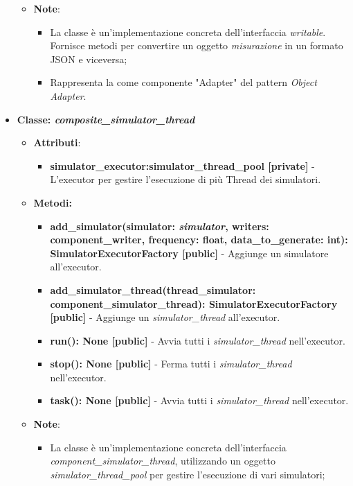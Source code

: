 \begin{itemize}
\begin{itemize}
\begin{itemize}
        \end{itemize}
        \item\textbf{Note}:
        \begin{itemize}
            \item La classe è un'implementazione concreta dell'interfaccia \textit{writable}. Fornisce metodi per convertire un oggetto \textit{misurazione} in un formato JSON e viceversa;
            \item Rappresenta la come componente "Adapter" del pattern \textit{Object Adapter}.
        \end{itemize}
    \end{itemize}
    \item{\textbf{Classe: \textit{composite\_simulator\_thread}}}
    \begin{itemize}
        \item\textbf{Attributi}:
        \begin{itemize}
            \item \textbf{simulator\_executor:simulator\_thread\_pool [private]} - L'executor per gestire l'esecuzione di più Thread dei simulatori.
        \end{itemize}
        \item \textbf{Metodi: }
        \begin{itemize}
            \item \textbf{add\_simulator(simulator: \textit{simulator}, writers: component\_writer, frequency: float, data\_to\_generate: int): SimulatorExecutorFactory [public]} - Aggiunge un simulatore all'executor.
            \item \textbf{add\_simulator\_thread(thread\_simulator: component\_simulator\_thread): SimulatorExecutorFactory [public]} - Aggiunge un \textit{simulator\_thread} all'executor.
            \item \textbf{run(): None [public]} - Avvia tutti i \textit{simulator\_thread} nell'executor.
            \item \textbf{stop(): None [public]} - Ferma tutti i \textit{simulator\_thread} nell'executor.
            \item \textbf{task(): None [public]} - Avvia tutti i \textit{simulator\_thread} nell'executor.
        \end{itemize}
        \item\textbf{Note}:
        \begin{itemize}
            \item La classe è un'implementazione concreta dell'interfaccia \textit{component\_simulator\_thread}, utilizzando un oggetto \textit{simulator\_thread\_pool} per gestire l'esecuzione di vari simulatori;

\end{itemize}
\end{itemize}
\end{itemize}
